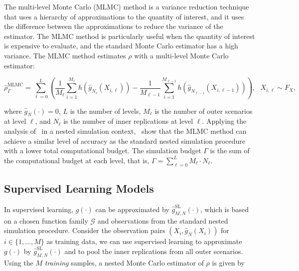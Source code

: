 The multi-level Monte Carlo (MLMC) method is a variance reduction technique that uses a hierarchy of approximations to the quantity of interest, and it uses the difference between the approximations to reduce the variance of the estimator.
The MLMC method is particularly useful when the quantity of interest is expensive to evaluate, and the standard Monte Carlo estimator has a high variance.
The MLMC method estimates $\rho$ with a multi-level Monte Carlo estimator:

\begin{equation*}
    \hat{\rho}^{\text{MLMC}}_\Gamma = \sum_{\ell=0}^{L} \left( \frac{1}{M_{\ell}} \sum_{i=1}^{M_{\ell}} h(\hat{g}_{N_{\ell}}(X_{i, \ell})) - \frac{1}{M_{\ell-1}} \sum_{i=1}^{M_{\ell-1}} h(\hat{g}_{N_{\ell-1}}(X_{i, \ell-1})) \right), ~~~ X_{i, \ell} \sim F_X,
\end{equation*}

where $\hat{g}_N(\cdot) = 0$, $L$ is the number of levels, $M_{\ell}$ is the number of outer scenarios at level $\ell$, and $N_{\ell}$ is the number of inner replications at level $\ell$.
Applying the analysis of~\cite{giles2015multilevel} in a nested simulation context,~\cite{giles2019multilevel} show that the MLMC method can achieve a similar level of accuracy as the standard nested simulation procedure with a lower total computational budget.
The simulation budget $\Gamma$ is the sum of the computational budget at each level, that is, $\Gamma = \sum_{\ell=0}^{L} M_{\ell} \cdot N_{\ell}$.

\subsection{Supervised Learning Models}

In supervised learning, $g(\cdot)$ can be approximated by $\hat{g}^{\text{SL}}_{M, N}(\cdot)$, which is based on a chosen function family $\mathcal{G}$ and observations from the standard nested simulation procedure.
Consider the observation pairs $(X_i, \hat{g}_N(X_i))$ for $i \in \{1, \dots, M\}$ as training data, we can use supervised learning to approximate $g(\cdot)$ by $\hat{g}^{\text{SL}}_{M, N}(\cdot)$ and to pool the inner replications from all outer scenarios.
Using the $M$ \textit{training} samples, a nested Monte Carlo estimator of $\rho$ is given by

